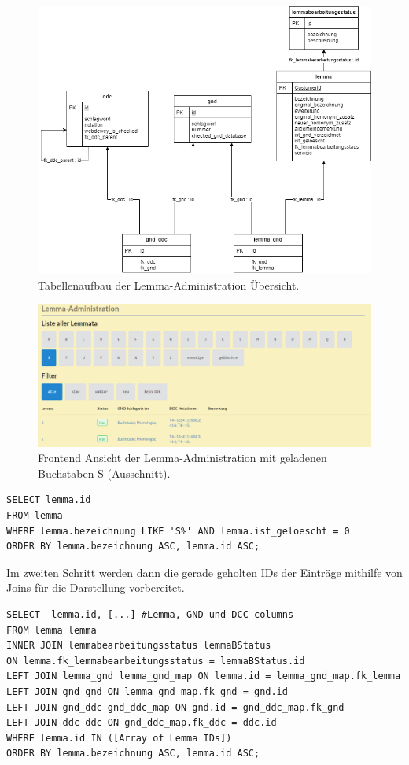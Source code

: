 \begin{figure}
	\centering
	\includegraphics[width=0.8\linewidth]{images/structure_lemmaadministration.png}
	\caption{Tabellenaufbau der Lemma-Administration Übersicht.}
	\label{img:lAdminStructure}
\end{figure}

\begin{figure}
	\centering
	\includegraphics[width=1\linewidth]{images/lemmaadministration_sample.PNG}
	\caption{Frontend Ansicht der Lemma-Administration mit geladenen Buchstaben S (Ausschnitt).}
	\label{img:lAdminSample}
\end{figure}

\lstset{language=SQL}
\begin{lstlisting}[frame=single] 
SELECT lemma.id
FROM lemma
WHERE lemma.bezeichnung LIKE 'S%' AND lemma.ist_geloescht = 0
ORDER BY lemma.bezeichnung ASC, lemma.id ASC;
\end{lstlisting}

Im zweiten Schritt werden dann die gerade geholten IDs der Einträge mithilfe von Joins für die Darstellung vorbereitet.

\lstset{language=SQL}
\begin{lstlisting}[frame=single, label={lst:sqlQuery}] 
SELECT  lemma.id, [...] #Lemma, GND und DCC-columns        
FROM lemma lemma
INNER JOIN lemmabearbeitungsstatus lemmaBStatus
ON lemma.fk_lemmabearbeitungsstatus = lemmaBStatus.id
LEFT JOIN lemma_gnd lemma_gnd_map ON lemma.id = lemma_gnd_map.fk_lemma
LEFT JOIN gnd gnd ON lemma_gnd_map.fk_gnd = gnd.id
LEFT JOIN gnd_ddc gnd_ddc_map ON gnd.id = gnd_ddc_map.fk_gnd
LEFT JOIN ddc ddc ON gnd_ddc_map.fk_ddc = ddc.id
WHERE lemma.id IN ([Array of Lemma IDs])
ORDER BY lemma.bezeichnung ASC, lemma.id ASC;

\end{lstlisting}